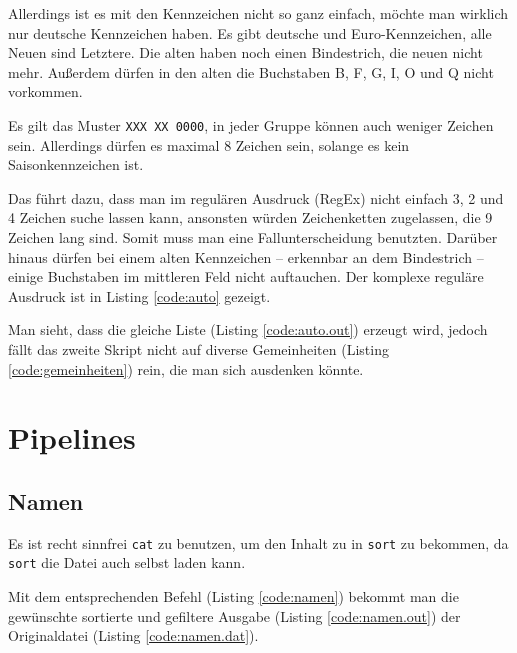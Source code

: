 

Allerdings ist es mit den Kennzeichen nicht so ganz einfach, möchte man wirklich nur deutsche Kennzeichen haben. Es gibt deutsche und Euro-Kennzeichen, alle Neuen sind Letztere. Die alten haben noch einen Bindestrich, die neuen nicht mehr. Außerdem dürfen in den alten die Buchstaben B, F, G, I, O und Q nicht vorkommen.\cite{wiki-kfz}

Es gilt das Muster \texttt{XXX XX 0000}, in jeder Gruppe können auch weniger Zeichen sein. Allerdings dürfen es maximal 8 Zeichen sein, solange es kein Saisonkennzeichen ist.

Das führt dazu, dass man im regulären Ausdruck (RegEx) nicht einfach 3, 2 und 4 Zeichen suche lassen kann, ansonsten würden Zeichenketten zugelassen, die 9 Zeichen lang sind. Somit muss man eine Fallunterscheidung benutzten. Darüber hinaus dürfen bei einem alten Kennzeichen -- erkennbar an dem Bindestrich -- einige Buchstaben im mittleren Feld nicht auftauchen. Der komplexe reguläre Ausdruck ist in Listing \ref{code:auto} gezeigt.



Man sieht, dass die gleiche Liste (Listing \ref{code:auto.out}) erzeugt wird, jedoch fällt das zweite Skript nicht auf diverse Gemeinheiten (Listing \ref{code:gemeinheiten}) rein, die man sich ausdenken könnte.


\section{Pipelines}
\subsection{Namen}

Es ist recht sinnfrei \texttt{cat} zu benutzen, um den Inhalt zu in \texttt{sort} zu bekommen, da \texttt{sort} die Datei auch selbst laden kann.

Mit dem entsprechenden Befehl (Listing \ref{code:namen}) bekommt man die gewünschte sortierte und gefiltere Ausgabe (Listing \ref{code:namen.out}) der Originaldatei (Listing \ref{code:namen.dat}).

